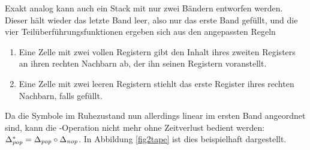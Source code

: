 \documentclass{article}
\begin{document}
Exakt analog kann auch ein Stack mit nur zwei Bändern entworfen werden. Dieser hält wieder das letzte Band leer, also nur das erste Band gefüllt, und die vier Teilüberführungsfunktionen ergeben sich aus den angepassten Regeln
\begin{enumerate}
    \item Eine Zelle mit zwei vollen Registern gibt den Inhalt ihres zweiten Registers an ihren rechten Nachbarn ab, der ihn seinen Registern voranstellt.
        \begin{center}
        \end{center}
    \item Eine Zelle mit zwei leeren Registern stiehlt das erste Register ihres rechten Nachbarn, falls gefüllt.
        \begin{center}
        \end{center}
\end{enumerate}
Da die Symbole im Ruhezustand nun allerdings linear im ersten Band angeordnet sind, kann die \pop-Operation nicht mehr ohne Zeitverlust bedient werden: $\Delta^*_{\mathit{pop}}=\Delta_{\mathit{pop}} \circ \Delta_{\mathit{nop}}$. In Abbildung \ref{fig2tape} ist dies beispielhaft dargestellt.
\end{document}
